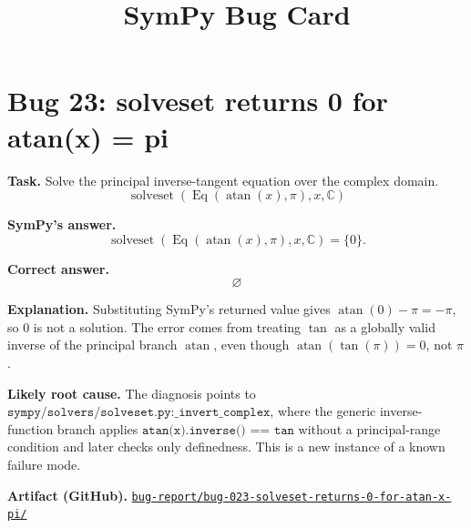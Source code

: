 \documentclass[11pt]{article}
\title{SymPy Bug Card}
\author{}
\date{}
\newcommand{\artifactrepo}{https://github.com/TODO-org/TODO-repo}
\newcommand{\bugbundle}[1]{\href{\artifactrepo/tree/main/bug-report/#1}{\nolinkurl{bug-report/#1/}}}
\begin{document}
\maketitle

\section*{Bug 23: solveset returns 0 for atan(x) = pi}

\begin{counterexamplebox}
\textbf{Task.} Solve the principal inverse-tangent equation over the complex domain.
\[
  \operatorname{solveset}(\operatorname{Eq}(\operatorname{atan}(x), \pi), x, \mathbb{C})
\]

\medskip
\textbf{SymPy's answer.}
\[
  \operatorname{solveset}(\operatorname{Eq}(\operatorname{atan}(x), \pi), x, \mathbb{C}) = \{0\}.
\]

\medskip
\textbf{Correct answer.}
\[
  \varnothing
\]

\medskip
\textbf{Explanation.} Substituting SymPy's returned value gives
\(\operatorname{atan}(0) - \pi = -\pi\), so \(0\) is not a solution.  The error
comes from treating \(\tan\) as a globally valid inverse of the principal branch
\(\operatorname{atan}\), even though \(\operatorname{atan}(\tan(\pi)) = 0\), not
\(\pi\).

\medskip
\textbf{Likely root cause.} The diagnosis points to
\(\texttt{sympy/solvers/solveset.py:\_invert\_complex}\), where the generic
inverse-function branch applies \(\texttt{atan(x).inverse() == tan}\) without a
principal-range condition and later checks only definedness.  This is a new
instance of a known failure mode.

\medskip
\textbf{Artifact (GitHub).} \bugbundle{bug-023-solveset-returns-0-for-atan-x-pi}
\end{counterexamplebox}
\end{document}
